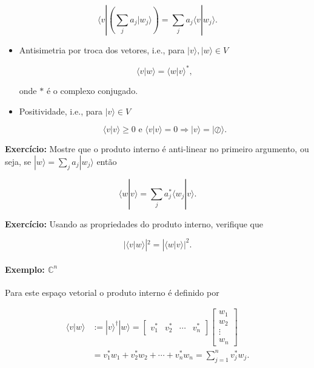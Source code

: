 \documentclass[11pt]{article}
\providecommand{\tightlist}{%
      \setlength{\itemsep}{0pt}\setlength{\parskip}{0pt}}
\begin{document}
\begin{equation}
\langle v|\left(\sum_{j}a_{j}|w_{j}\rangle\right) = \sum_{j}a_{j}\langle v|w_{j}\rangle.
\end{equation}

\begin{itemize}
\tightlist
\item
  Antisimetria por troca dos vetores, i.e., para
  \(|v\rangle,|w\rangle\in V\)

  \begin{equation}
  \langle v|w\rangle = \langle w|v\rangle^{*},
  \end{equation}

  onde \(*\) é o complexo conjugado.
\item
  Positividade, i.e., para \(|v\rangle\in V\)

  \begin{equation}
  \langle v|v\rangle\ge 0\text{ e }\langle v|v\rangle=0\Rightarrow |v\rangle=|\oslash\rangle.
  \end{equation}
\end{itemize}

\textbf{Exercício:} Mostre que o produto interno é anti-linear no
primeiro argumento, ou seja, se \(|w\rangle=\sum_{j}a_{j}|w_{j}\rangle\)
então

\begin{equation}
\langle w|v\rangle = \sum_{j}a_{j}^{*}\langle w_{j}|v\rangle.
\end{equation}

\textbf{Exercício:} Usando as propriedades do produto interno, verifique
que

\begin{equation}
|\langle v|w\rangle|^{2}=|\langle w|v\rangle|^{2}.
\end{equation}

    \paragraph{\texorpdfstring{Exemplo:
\(\mathbb{C}^{n}\)}{Exemplo: \textbackslash{}mathbb\{C\}\^{}\{n\}}}\label{exemplo-mathbbcn}

Para este espaço vetorial o produto interno é definido por

\begin{align}
\langle v|w\rangle & := |v\rangle^{\dagger}|w\rangle = \begin{bmatrix} v_{1}^{*} & v_{2}^{*} & \cdots & v_{n}^{*} \end{bmatrix}\begin{bmatrix} w_{1} \\ w_{2} \\ \vdots \\ w_{n} \end{bmatrix} \\
& = v_{1}^{*}w_{1}+v_{2}^{*}w_{2}+\cdots+v_{n}^{*}w_{n}= \sum_{j=1}^{n}v_{j}^{*}w_{j}.
\end{align}
\end{document}
